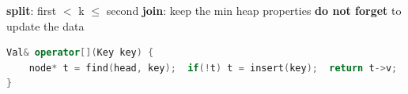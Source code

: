 \textbf{split}: first $<$ k $\le$ second \quad
\textbf{join}: keep the min heap properties \quad
\textbf{do not forget} to update the data
\begin{lstlisting}[language=c++]
Val& operator[](Key key) {
    node* t = find(head, key);  if(!t) t = insert(key);  return t->v;
}
\end{lstlisting}
